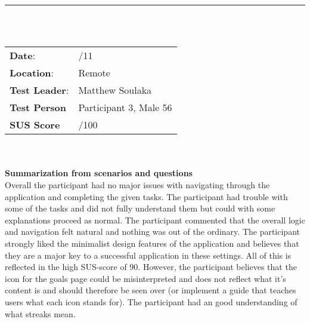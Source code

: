 \noindent\rule{15.1cm}{0.4pt}\\
\\
\begin{tabularx}{0.6\textwidth}{ >{\raggedright\arraybackslash}X  >{\raggedright\arraybackslash}X  }
\textbf{Date}: & 21/11  \\
\textbf{Location}: & Remote  \\
\textbf{Test Leader}: & Matthew Soulaka  \\
\textbf{Test Person} & Participant 3, Male 56  \\
\textbf{SUS Score} & 90/100  \\

\end{tabularx}\\
\\
\textbf{Summarization from scenarios and questions} \\
\noindent Overall the participant had no major issues with navigating through the application and completing the given tasks. The participant had trouble with some of the tasks and did not fully understand them but could with some explanations proceed as normal. The participant commented that the overall logic and navigation felt natural and nothing was out of the ordinary. The participant strongly liked the minimalist design features of the application and believes that they are a major key to a successful application in these settings. All of this is reflected in the high SUS-score of 90. However, the participant believes that the icon for the goals page could be misinterpreted and does not reflect what it’s content is and should therefore be seen over (or implement  a guide that teaches users what each icon stands for).  The participant had an good understanding of what streaks mean.\\

